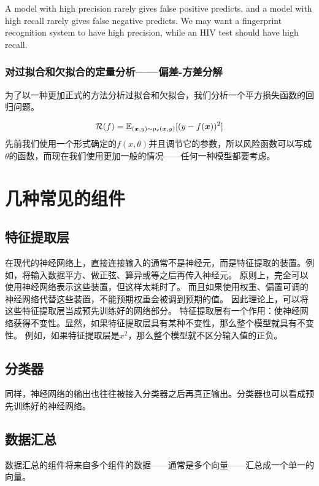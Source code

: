 \documentclass[UTF8, a4paper]{ctexart}
\begin{document}
A model with high precision rarely gives false positive predicts, and a model with high recall rarely gives false negative predicts. We may want a fingerprint recognition system to have high precision, while an HIV test should have high recall.

\hypertarget{sec:bias-and-variance}{%
\subsubsection{对过拟合和欠拟合的定量分析——偏差-方差分解}\label{sec:bias-and-variance}}

为了以一种更加正式的方法分析过拟合和欠拟合，我们分析一个平方损失函数的回归问题。

\[
\mathcal{R}(f) = \mathbb{E}_{(\vb*{x}, y)\sim p_r(\vb*{x}, y)}[(y-f(\vb*{x}))^2]
\]
先前我们使用一个形式确定的$f(x, \theta)$并且调节它的参数，所以风险函数可以写成$\theta$的函数，而现在我们使用更加一般的情况——任何一种模型都要考虑。

\section{几种常见的组件}

\subsection{特征提取层}

在现代的神经网络上，直接连接输入的通常不是神经元，而是特征提取的装置。例如，将输入数据平方、做正弦、算异或等之后再传入神经元。
原则上，完全可以使用神经网络表示这些装置，但这样太耗时了。
而且如果使用权重、偏置可调的神经网络代替这些装置，不能预期权重会被调到预期的值。
因此理论上，可以将这些特征提取层当成预先训练好的网络部分。
特征提取层有一个作用：使神经网络获得不变性。显然，如果特征提取层具有某种不变性，那么整个模型就具有不变性。
例如，如果特征提取层是$x^2$，那么整个模型就不区分输入值的正负。

\subsection{分类器}

同样，神经网络的输出也往往被接入分类器之后再真正输出。分类器也可以看成预先训练好的神经网络。

\subsection{数据汇总}
数据汇总的组件将来自多个组件的数据——通常是多个向量——汇总成一个单一的向量。
\end{document}
